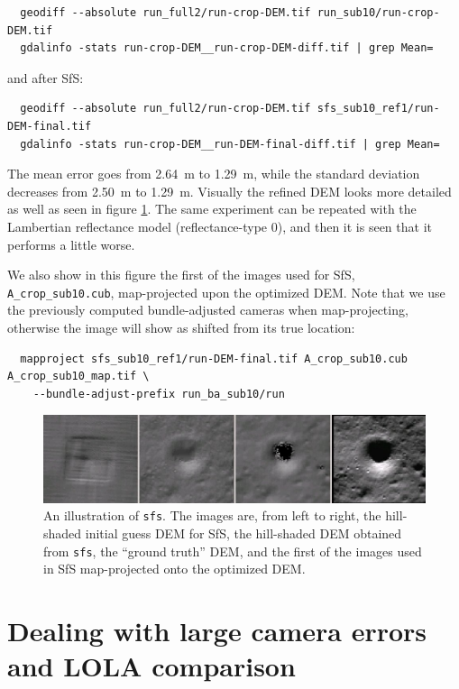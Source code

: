 \begin{verbatim}
  geodiff --absolute run_full2/run-crop-DEM.tif run_sub10/run-crop-DEM.tif
  gdalinfo -stats run-crop-DEM__run-crop-DEM-diff.tif | grep Mean=  
\end{verbatim}
and after SfS:
\begin{verbatim}
  geodiff --absolute run_full2/run-crop-DEM.tif sfs_sub10_ref1/run-DEM-final.tif
  gdalinfo -stats run-crop-DEM__run-DEM-final-diff.tif | grep Mean=
\end{verbatim}

The mean error goes from 2.64~m to 1.29~m, while the standard deviation
decreases from 2.50~m to 1.29~m. Visually the refined DEM looks more detailed
as well as seen in figure \ref{fig:sfs2}. The same experiment can be
repeated with the Lambertian reflectance model (reflectance-type 0), and
then it is seen that it performs a little worse. 

We also show in this figure the first of the images used for SfS,
\verb#A_crop_sub10.cub#, map-projected upon the optimized DEM. Note that
we use the previously computed bundle-adjusted cameras when
map-projecting, otherwise the image will show as shifted from its true
location:
\begin{verbatim}
  mapproject sfs_sub10_ref1/run-DEM-final.tif A_crop_sub10.cub A_crop_sub10_map.tif \
    --bundle-adjust-prefix run_ba_sub10/run
\end{verbatim}
\begin{figure}[h!]
  \begin{center}
    \includegraphics[width=7in]{images/sfs2.jpg}
    \caption[sfs]{An illustration of \texttt{sfs}. The images are, from
      left to right, the hill-shaded initial guess DEM for SfS, the hill-shaded DEM obtained
      from \texttt{sfs}, the ``ground truth'' DEM, and the first of the
      images used in SfS map-projected onto the optimized DEM.}
    \label{fig:sfs2}
  \end{center}
\end{figure}

\section{Dealing with large camera errors and LOLA comparison}
\label{sfs-lola}

